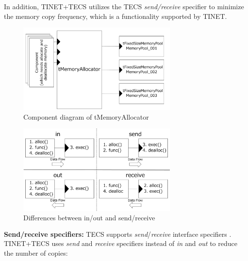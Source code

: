 \documentclass[conference]{IEEEtran/IEEEtran}
\begin{document}
In addition, TINET+TECS utilizes the TECS {\it send/receive} specifier to minimize the memory copy frequency, which is a functionality supported by TINET.

\begin{figure}[t]
    \centering
    \includegraphics[width=8.0cm,clip]{figure/tMemoryAllocator.pdf}
    \vspace{-1mm} \caption{Component diagram of tMemoryAllocator}
    \vspace{-1mm} \label{fig:tMemoryAllocator}
\end{figure}

\begin{figure}[t]
    \centering
    \includegraphics[width=8.0cm,clip]{figure/SendReceive.pdf}
    \vspace{-1mm} \caption{Differences between in/out and send/receive}
    \vspace{-1mm} \label{fig:SendReceive}
\end{figure}

{\bf Send/receive specifiers:}
TECS supports {\it send}/{\it receive} interface specifiers \cite{par:RPC}.
TINET+TECS uses {\it send} and {\it receive} specifiers instead of {\it in} and {\it out} to reduce the number of copies:
\end{document}

